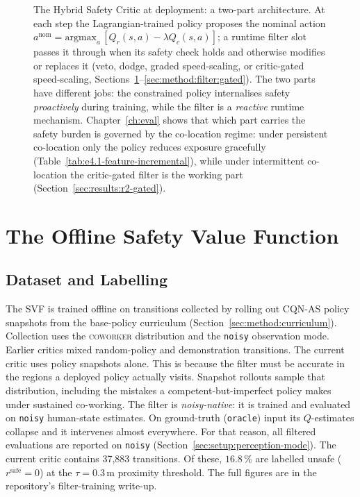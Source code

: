 \documentclass[11pt,a4paper]{report}
\newcommand{\cqnas}{CQN-AS}
\newcommand{\coworker}{\textsc{coworker}}
\begin{document}
\begin{figure}[htbp]
{%
}
\caption{The Hybrid Safety Critic at deployment: a two-part
architecture. At each step the Lagrangian-trained policy proposes the
nominal action
$a^{\mathrm{nom}} = \mathrm{argmax}_a\,[Q_r(s,a) - \lambda Q_c(s,a)]$;
a runtime filter slot passes it through when its safety check holds
and otherwise modifies or replaces it (veto, dodge, graded
speed-scaling, or critic-gated speed-scaling,
Sections~\ref{sec:method:filter}--\ref{sec:method:filter:gated}). The
two parts have different jobs: the constrained policy
internalises safety \emph{proactively} during training, while the
filter is a \emph{reactive} runtime mechanism. Chapter~\ref{ch:eval}
shows that which part carries the safety burden is governed by the
co-location regime: under persistent co-location only the policy
reduces exposure gracefully
(Table~\ref{tab:e4.1-feature-incremental}), while under intermittent
co-location the critic-gated filter is the working part
(Section~\ref{sec:results:r2-gated}).}
\label{fig:hybrid-overview}
\end{figure}

\section{The Offline Safety Value Function}
\label{sec:method:filter}

\subsection{Dataset and Labelling}
\label{sec:method:filter:data}

The SVF is trained offline on transitions collected by rolling out
\cqnas{} policy snapshots from the base-policy curriculum
(Section~\ref{sec:method:curriculum}). Collection uses the
\coworker{} distribution and the \texttt{noisy} observation mode.
Earlier critics mixed random-policy and demonstration transitions. The
current critic uses policy snapshots alone. This is because the filter
must be accurate in the regions a deployed policy actually visits.
Snapshot rollouts sample that distribution, including the mistakes a
competent-but-imperfect policy makes under sustained co-working. The
filter is \emph{noisy-native}: it is trained and evaluated on
\texttt{noisy} human-state estimates. On ground-truth
(\texttt{oracle}) input its $Q$-estimates collapse and it intervenes
almost everywhere. For that reason, all filtered evaluations are
reported on \texttt{noisy}
(Section~\ref{sec:setup:perception-mode}). The current critic contains
37{,}883 transitions. Of these, $16.8\,\%$ are labelled unsafe
($r^{\mathrm{safe}} = 0$) at the $\tau = 0.3$\,m proximity threshold.
The full figures are in the repository's filter-training write-up.
\end{document}
